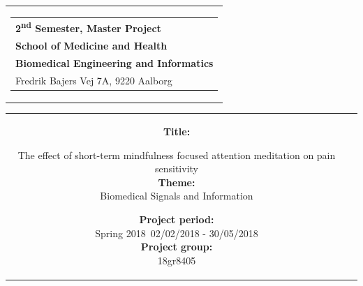 % 
\thispagestyle{empty}
\begin{titlepage}
\begin{nopagebreak}
{\samepage 

\begin{tabular}{r}
\parbox{\textwidth}{  
\hfill \hspace{2cm} \parbox{8cm}{\begin{tabular}{l} %
{\small \textbf{\textcolor{aaublue}{{2\textsuperscript{nd} Semester, Master Project}}}}\\
{\small \textbf{\textcolor{aaublue}{School of Medicine and Health}}}\\
{\small \textbf{\textcolor{aaublue}{Biomedical Engineering and Informatics}}}\\
{\small \textcolor{aaublue}{Fredrik Bajers Vej 7A, 9220 Aalborg}} \\
\end{tabular}}}
\end{tabular}

\begin{tabular}{cc}
\parbox{7cm}{

\textbf{Title:} 

The effect of short-term mindfulness focused attention meditation on pain sensitivity  \\ 

\textbf{Theme:} \\
\small{
 Biomedical Signals and Information\\
}


\parbox{8cm}{


\textbf{Project period:}\\
Spring 2018\
02/02/2018 - 30/05/2018\\
   
\textbf{Project group: }\\
18gr8405 \\
  
}}
\end{tabular}}
\end{nopagebreak}
\end{titlepage}
